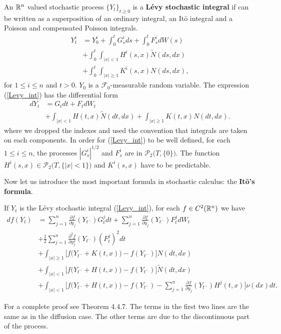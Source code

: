 An $\mathbb{R}^n$ valued stochastic process $\{Y_t\}_{t \ge 0}$ is a \textbf{Lévy stochastic integral} if can be written as a superposition of
an ordinary integral, an It\={o} integral and a Poisson and compensated Poisson integrals.  
\begin{align} \label{Levy_int}
 Y^i_t &= Y^i_0 + \int_0^{t} G^i_s ds  + \int_0^{t} F^i_s dW(s)\\ \nonumber
     &+ \int_0^{t} \int_{|x|<1} H^i(s,x) \tilde N (ds,dx)\\ \nonumber
     &+ \int_0^{t} \int_{|x|\geq 1} K^i(s,x) N(ds,dx),
\end{align}
for $1 \leq i \leq n$ and $t>0$.  $Y_0$ is a $\mathcal{F}_0$-measurable random variable. 
The expression (\ref{Levy_int}) has the differential form
\begin{align} \label{Levy_diff}
 dY_t &= G_t dt  + F_t dW_t \\ \nonumber
     &+ \int_{|x|<1} H(t,x) \tilde N (dt,dx) + \int_{|x|\geq 1} K(t,x) N(dt,dx).
\end{align}
where we dropped the indexes and used the convention that integrals are taken on each components.
In order for (\ref{Levy_int}) to be well defined, for each $1 \leq i \leq n$, the processes $|G^i_s|^{1/2}$ and $F^i_s$ are in $\mathcal{P}_2 \bigl( T,\{0\} \bigr)$.
The function $H^i(s,x) \in \mathcal{P}_2 \bigl( T, \{ |x|<1 \} \bigr)$ 
and $K^i(s,x)$ have to be predictable.

Now let us introduce the most important formula in stochastic calculus: the \textbf{It\={o}'s formula}.
\begin{Theorem}
If $Y_t$ is the Lévy stochastic integral (\ref{Levy_int}), for each $f \in C^2(\mathbb{R}^n)$ we have  
\begin{align} \label{Ito_form}
 df(Y_t) &=  \sum_{j=1}^n \frac{\partial f}{\partial y_j}(Y_{t^-}) G^j_t  dt  + \sum_{j=1}^n \frac{\partial f}{\partial y_j}(Y_{t^-}) F^j_t dW_t \\ \nonumber
          &+ \frac{1}{2} \sum_{j=1}^n \frac{\partial^2 f}{\partial y_j^2}(Y_{t^-}) (F^j_t)^2 dt \\ \nonumber 
          &+ \int_{|x|\geq 1} \bigl[ f\bigl( Y_{t^-} + K(t,x) \bigr) - f( Y_{t^-} ) \bigr] N(dt,dx) \\ \nonumber
          &+ \int_{|x|< 1} \bigl[ f\bigl( Y_{t^-} + H(t,x) \bigr) - f(Y_{t^-}) \bigr] \tilde N(dt,dx) \\ \nonumber  
          &+ \int_{|x|< 1} \bigl[ f\bigl( Y_{t^-} + H(t,x) \bigr) - f(Y_{t^-}) - \sum_{j=1}^n \frac{\partial f}{\partial y_j}(Y_{t^-}) H^j(t,x) \bigr] \nu(dx)dt. \nonumber
\end{align}
\end{Theorem}
For a complete proof see \cite{Applebaum} Theorem 4.4.7.
The terms in the first two lines are the same as in
the diffusion case. The other terms are due to the discontinuous part of the process.

